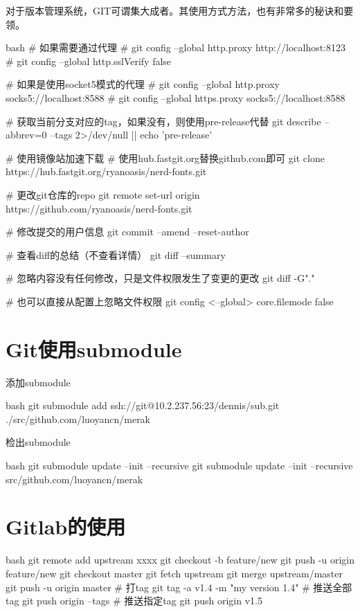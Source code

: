 对于版本管理系统，GIT可谓集大成者。其使用方式方法，也有非常多的秘诀和要领。
\begin{code-block}{bash}
# 如果需要通过代理
# git config --global http.proxy http://localhost:8123
# git config --global http.sslVerify false

# 如果是使用socket5模式的代理
# git config --global http.proxy socks5://localhost:8588
# git config --global https.proxy socks5://localhost:8588

# 获取当前分支对应的tag，如果没有，则使用pre-release代替
git describe --abbrev=0 --tags 2>/dev/null || echo 'pre-release'

# 使用镜像站加速下载
# 使用hub.fastgit.org替换github.com即可
git clone https://hub.fastgit.org/ryanoasis/nerd-fonts.git

# 更改git仓库的repo
git remote set-url origin https://github.com/ryanoasis/nerd-fonts.git

# 修改提交的用户信息
git commit --amend --reset-author

# 查看diff的总结（不查看详情）
git diff --summary

# 忽略内容没有任何修改，只是文件权限发生了变更的更改
git diff -G"."

# 也可以直接从配置上忽略文件权限
git config <--global> core.filemode false
\end{code-block}

\section{Git使用submodule}
添加submodule
\begin{code-block}{bash}
git submodule add ssh://git@10.2.237.56:23/dennis/sub.git ./src/github.com/luoyancn/merak
\end{code-block}
检出submodule
\begin{code-block}{bash}
git submodule update --init --recursive
git submodule update --init --recursive src/github.com/luoyancn/merak
\end{code-block}

\section{Gitlab的使用}
\begin{code-block}{bash}
git remote add upstream xxxx
git checkout -b feature/new
git push -u origin feature/new
git checkout master
git fetch upstream
git merge upstream/master
git push -u origin master
# 打tag
git tag -a v1.4 -m "my version 1.4"
# 推送全部tag
git push origin --tags
# 推送指定tag
git push origin v1.5
\end{code-block}

